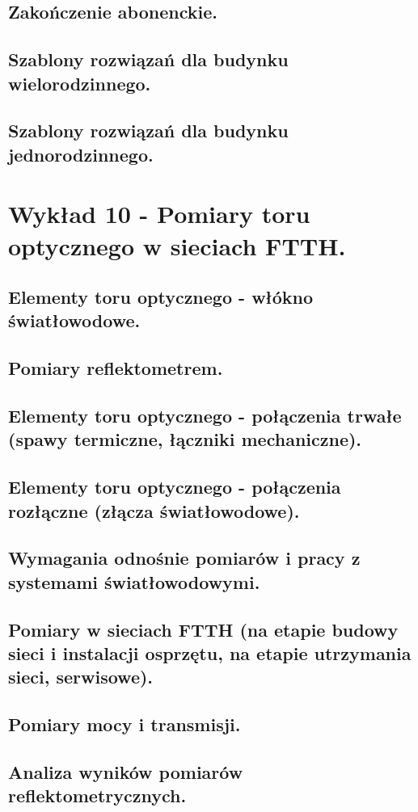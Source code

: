 \documentclass{article}
\begin{document}
\subsection{Zakończenie abonenckie.}
\subsection{Szablony rozwiązań dla budynku wielorodzinnego.}
\subsection{Szablony rozwiązań dla budynku jednorodzinnego.}
\newpage
\section{Wykład 10 - Pomiary toru optycznego w sieciach FTTH.}
\subsection{Elementy toru optycznego - włókno światłowodowe.}
\subsection{Pomiary reflektometrem.}
\subsection{Elementy toru optycznego - połączenia trwałe (spawy termiczne, łączniki mechaniczne).}
\subsection{Elementy toru optycznego - połączenia rozłączne (złącza światłowodowe).}
\subsection{Wymagania odnośnie pomiarów i pracy z systemami światłowodowymi.}
\subsection{Pomiary w sieciach FTTH (na etapie budowy sieci i instalacji osprzętu, na etapie utrzymania sieci, serwisowe).}
\subsection{Pomiary mocy i transmisji.}
\subsection{Analiza wyników pomiarów reflektometrycznych.}
\end{document}

